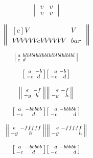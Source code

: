 \documentclass{article}
\newcommand{\horz}{\noindent\makebox[\linewidth]{\rule{\paperwidth}{0.4pt}}}
\begin{document}
\[
\begin{vmatrix*}
v & v \\
v & v
\end{vmatrix*}
\]

\[
\begin{Vmatrix*}[c]
V & V \\
VVVVVVcVVVVVV & bar
\end{Vmatrix*}
\]

\horz

\[
\begin{vsmallmatrix*}[l]
a & blblblbllbblblblblblblbl \\
c & d
\end{vsmallmatrix*}
\]

\[
\begin{bsmallmatrix} a & -b \\ -c & d \end{bsmallmatrix}
\begin{bsmallmatrix*}[r] a & -b \\ -c & d \end{bsmallmatrix*}
\]

\[
\begin{Vsmallmatrix} e & -f \\ -g & h \end{Vsmallmatrix}
\begin{Vsmallmatrix*}[r] e & -f \\ -g & h \end{Vsmallmatrix*}
\]

\horz

\[
\begin{bsmallmatrix*} a & -bbbbb \\ -c & d \end{bsmallmatrix*}
\begin{bsmallmatrix*}[r] a & -bbbbb \\ -c & d \end{bsmallmatrix*}
\]

\[
\begin{Vsmallmatrix*} e & -fffff \\ -g & h \end{Vsmallmatrix*}
\begin{Vsmallmatrix*}[r] e & -fffff \\ -g & h \end{Vsmallmatrix*}
\]


\[
\begin{bsmallmatrix*} a & -bbbbb \\ -c & d \end{bsmallmatrix*}
\begin{bsmallmatrix*}[r] a & -bbbbb \\ -c & d \end{bsmallmatrix*}
\]
\end{document}
